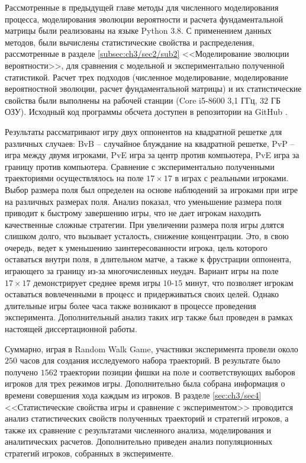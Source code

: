 Рассмотренные в предыдущей главе методы для численного моделирования процесса, моделирования эволюции вероятности и расчета фундаментальной матрицы были реализованы на языке Python 3.8. С применением данных методов, были вычислены статистические свойства и распределения, рассмотренные в разделе \cref{subsec:ch3/sec2/sub2} <<Моделирование эволюции вероятности>>, для сравнения с модельной и экспериментально полученной статистикой. Расчет трех подходов (численное моделирование, моделирование вероятностной эволюции, расчет фундаментальной матрицы) и их статистические свойства были выполнены на рабочей станции (Core i5-8600 3,1 ГГц, 32 ГБ ОЗУ). Исходный код программы обсчета доступен в репозитории на GitHub \cite{RWAnalyzer}.




Результаты рассматривают игру двух оппонентов на квадратной решетке для различных случаев: BvB -- случайное блуждание на квадратной решетке, PvP -- игра между двумя игроками, PvE игра за центр против компьютера, PvE игра за границу против компьютера. Сравнение с экспериментально полученными траекториями осуществлялось на поле $17 \times 17$ в играх с реальными игроками. Выбор размера поля был определен на основе наблюдений за игроками при игре на различных размерах поля. Анализ показал, что уменьшение размера поля приводит к быстрому завершению игры, что не дает игрокам находить качественные сложные стратегии. При увеличении размера поля игры длятся слишком долго, что вызывает усталость, снижение концентрации. Это, в свою очередь, ведет к уменьшению заинтересованности игрока, цель которого оставаться внутри поля, в длительном матче, а также к фрустрации оппонента, играющего за границу из-за многочисленных неудач. Вариант игры на поле $17 \times 17$ демонстрирует среднее время игры $10$-$15$ минут, что позволяет игрокам оставаться вовлеченными в процесс и придерживаться своих целей. Однако длительные игры более часа также возникают в процессе проведения эксперимента. Дополнительный анализ таких игр также был проведен в рамках настоящей диссертационной работы.

Суммарно, играя в Random Walk Game, участники эксперимента провели около $250$ часов для создания исследуемого набора траекторий. В результате было получено $1562$ траектории позиции фишки на поле и соответствующих выборов игроков для трех режимов игры. Дополнительно была собрана информация о времени совершения хода каждым из игроков. В разделе \cref{sec:ch3/sec4} <<Статистические свойства игры и сравнение с экспериментом>> проводится анализ статистических свойств полученных траекторий и стратегий игроков, а также их сравнение с результатами численного анализа, моделирования и аналитических расчетов. Дополнительно приведен анализ популяционных стратегий игроков, собранных в эксперименте.

